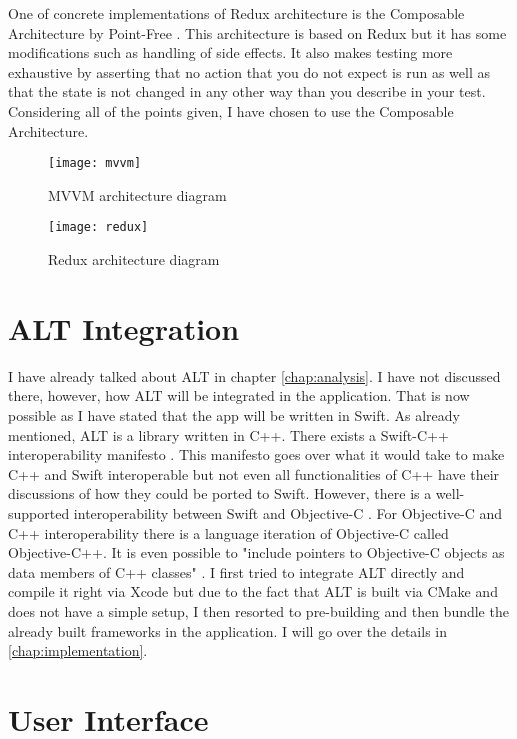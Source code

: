 One of concrete implementations of Redux architecture is the Composable Architecture by Point-Free \cite{tca}. This architecture is based on Redux but it has some modifications such as handling of side effects. It also makes testing more exhaustive by asserting that no action that you do not expect is run as well as that the state is not changed in any other way than you describe in your test. Considering all of the points given, I have chosen to use the Composable Architecture. 

\begin{figure}
    \texttt{[image: mvvm]}
    \caption{MVVM architecture diagram \cite{mvvm}}\label{mvvm}
\end{figure}

\begin{figure}
    \texttt{[image: redux]}
    \caption{Redux architecture diagram \cite{react-redux}}\label{redux}
\end{figure}

\section{ALT Integration}

I have already talked about ALT in chapter \ref{chap:analysis}. I have not discussed there, however, how ALT will be integrated in the application. That is now possible as I have stated that the app will be written in Swift. As already mentioned, ALT is a library written in C++. There exists a Swift-C++ interoperability manifesto \cite{swift-c++-manifesto}. This manifesto goes over what it would take to make C++ and Swift interoperable but not even all functionalities of C++ have their discussions of how they could be ported to Swift. However, there is a well-supported interoperability between Swift and Objective-C \cite{swift-objc-interoperability}. For Objective-C and C++ interoperability there is a language iteration of Objective-C called Objective-C++. It is even possible to "include pointers to Objective-C objects as data members of C++ classes" \cite{objc++}. I first tried to integrate ALT directly and compile it right via Xcode but due to the fact that ALT is built via CMake \cite{cmake} and does not have a simple setup, I then resorted to pre-building and then bundle the already built frameworks in the application. I will go over the details in \ref{chap:implementation}.

\section{User Interface}

